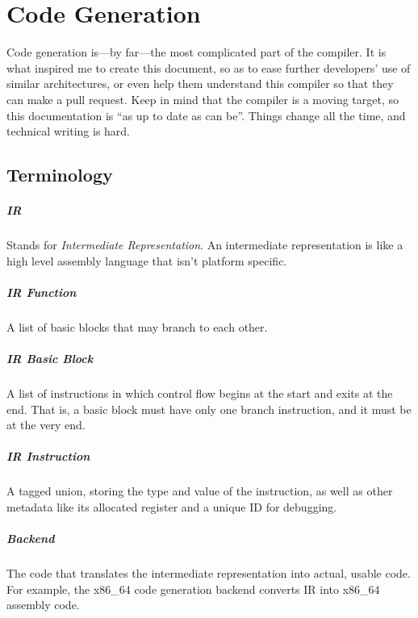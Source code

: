 \documentclass[
12pt,
letterpaper,
oneside,
]{memoir}
\begin{document}
\chapter{Code Generation}

Code generation is---by far---the most complicated part of the compiler. It is what inspired me to create this document, so as to ease further developers' use of similar architectures, or even help them understand this compiler so that they can make a pull request. Keep in mind that the compiler is a moving target, so this documentation is ``as up to date as can be''. Things change all the time, and technical writing is hard.

\section{Terminology}

\paragraph{IR} Stands for \emph{Intermediate Representation}. An intermediate representation is like a high level assembly language that isn't platform specific.

\paragraph{IR Function} A list of basic blocks that may branch to each other.

\paragraph{IR Basic Block} A list of instructions in which control flow begins at the start and exits at the end. That is, a basic block must have only one branch instruction, and it must be at the very end.

\paragraph{IR Instruction} A tagged union, storing the type and value of the instruction, as well as other metadata like its allocated register and a unique ID for debugging.

\paragraph{Backend} The code that translates the intermediate representation into actual, usable code. For example, the x86\_64 code generation backend converts IR into x86\_64 assembly code.
\end{document}
